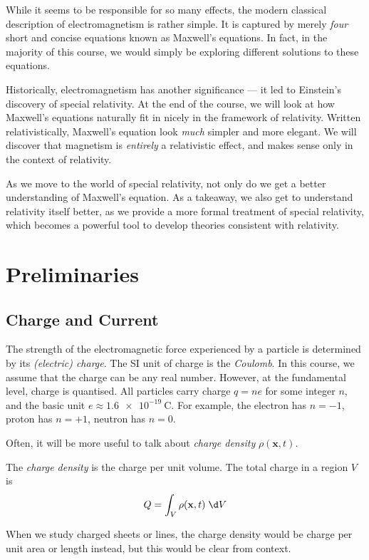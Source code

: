 \documentclass[a4paper]{article}
\begin{document}
While it seems to be responsible for so many effects, the modern classical description of electromagnetism is rather simple. It is captured by merely \emph{four} short and concise equations known as Maxwell's equations. In fact, in the majority of this course, we would simply be exploring different solutions to these equations.

Historically, electromagnetism has another significance --- it led to Einstein's discovery of special relativity. At the end of the course, we will look at how Maxwell's equations naturally fit in nicely in the framework of relativity. Written relativistically, Maxwell's equation look \emph{much} simpler and more elegant. We will discover that magnetism is \emph{entirely} a relativistic effect, and makes sense only in the context of relativity.

As we move to the world of special relativity, not only do we get a better understanding of Maxwell's equation. As a takeaway, we also get to understand relativity itself better, as we provide a more formal treatment of special relativity, which becomes a powerful tool to develop theories consistent with relativity.

\section{Preliminaries}
\subsection{Charge and Current}
The strength of the electromagnetic force experienced by a particle is determined by its \emph{(electric) charge}. The SI unit of charge is the \emph{Coulomb}. In this course, we assume that the charge can be any real number. However, at the fundamental level, charge is quantised. All particles carry charge $q = ne$ for some integer $n$, and the basic unit $e \approx \SI{1.6e-19}{\coulomb}$. For example, the electron has $n = -1$, proton has $n = +1$, neutron has $n = 0$.

Often, it will be more useful to talk about \emph{charge density} $\rho(\mathbf{x}, t)$.
\begin{defi}
  The \emph{charge density} is the charge per unit volume. The total charge in a region $V$ is
  \[
    Q = \int_V \rho(\mathbf{x}, t)\; \d V
  \]
\end{defi}
When we study charged sheets or lines, the charge density would be charge per unit area or length instead, but this would be clear from context.
\end{document}
